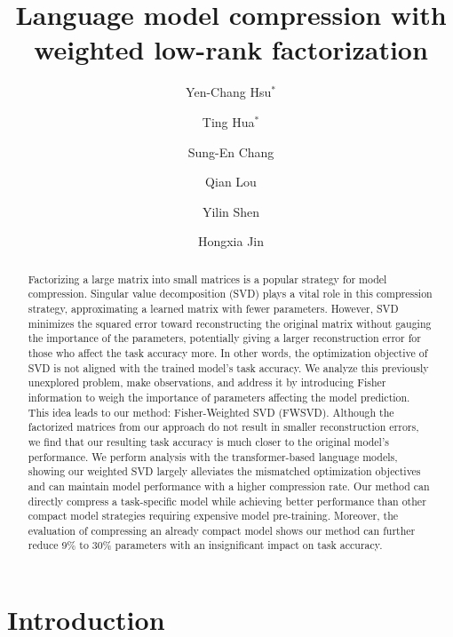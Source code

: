 \documentclass{article} %
\title{Language model compression with weighted low-rank factorization}
\author[1]{Yen-Chang Hsu$^*$}
\author[1]{Ting Hua$^*$}
\author[2]{Sung-En Chang}
\author[1]{ Qian Lou}
\author[1]{Yilin Shen}
\author[1]{Hongxia Jin}
\affil[1]{Samsung Research America }
\affil[2]{Northeastern University }
\affil[ ]{ \par  \{\tt yenchang.hsu, ting.hua, qian.lou, yilin.shen, hongxia.jin\}@samsung.com,\{\tt chang.sun\}@northeastern.edu}
\newcommand{\yilin}[1]{}
\newcommand{\yilin}[1]{{\color{red}{(yilin: #1)}}}
\begin{document}
\maketitle

\def\thefootnote{*}\def\thefootnote{\arabic{footnote}}

\begin{abstract}
Factorizing a large matrix into small matrices is a popular strategy for model compression. Singular value decomposition (SVD) plays a vital role in this compression strategy, approximating a learned matrix with fewer parameters. However, SVD minimizes the squared error toward reconstructing the original matrix without gauging the importance of the parameters, potentially giving a larger reconstruction error for those who affect the task accuracy more. In other words, the optimization objective of SVD is not aligned with the trained model's task accuracy. We analyze this previously unexplored problem, make observations, and address it by introducing Fisher information to weigh the importance of parameters affecting the model prediction. This idea leads to our method: Fisher-Weighted SVD (FWSVD). Although the factorized matrices from our approach do not result in smaller reconstruction errors, we find that our resulting task accuracy is much closer to the original model's performance. We perform analysis with the transformer-based language models, showing our weighted SVD largely alleviates the mismatched optimization objectives and can maintain model performance with a higher compression rate. Our method can directly compress a task-specific model while achieving better performance than other compact model strategies requiring expensive model pre-training.
Moreover, the evaluation of compressing an already compact model shows our method can further reduce 9\% to 30\% parameters with an insignificant impact on task accuracy.
\end{abstract}


\section{Introduction}
\end{document}
